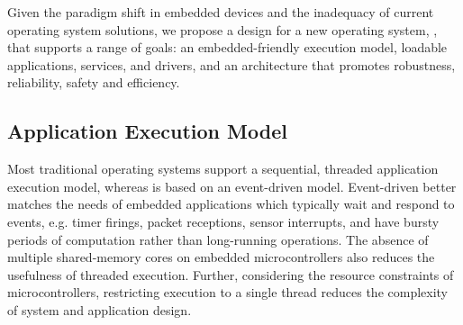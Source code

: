
Given the paradigm shift in embedded devices and the inadequacy of current
operating system solutions, we propose a design for a new operating system,
\name, that supports a range of goals: an embedded-friendly execution model,
loadable applications, services, and drivers, and an architecture that
promotes robustness, reliability, safety and efficiency.




\subsection{Application Execution Model}
\label{sec:os:execution}

Most traditional operating systems support a sequential, threaded application
execution model, whereas \name is based on an event-driven model. Event-driven
better matches the needs of embedded applications which typically wait and
respond to events, e.g. timer firings, packet receptions, sensor interrupts,
and have bursty periods of computation rather than long-running operations.
The absence of multiple shared-memory cores on embedded microcontrollers also
reduces the usefulness of threaded execution. Further, considering the
resource constraints of microcontrollers, restricting execution to a single
thread reduces the complexity of system and application design.





